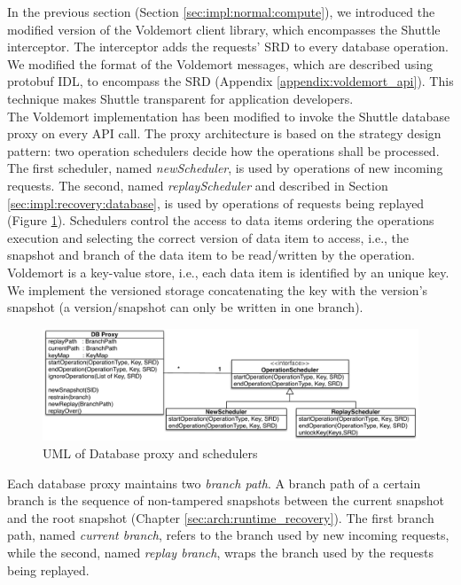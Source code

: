 In the previous section (Section \ref{sec:impl:normal:compute}), we introduced the modified version of the Voldemort client library, which encompasses the Shuttle interceptor. The interceptor adds the requests' \ac{SRD} to every database operation. We modified the format of the Voldemort messages, which are described using \acf{protobuf} \acs{IDL}, to encompass the \ac{SRD} (Appendix \ref{appendix:voldemort_api}). This technique makes Shuttle transparent for application developers.\\


The Voldemort implementation has been modified to invoke the Shuttle database proxy on every \ac{API} call. The proxy architecture is based on the strategy design pattern: two operation schedulers decide how the operations shall be processed. The first scheduler, named \emph{newScheduler}, is used by operations of new incoming requests. The second, named \emph{replayScheduler} and described in Section \ref{sec:impl:recovery:database}, is used by operations of requests being replayed (Figure \ref{fig:scheduler_uml}). Schedulers control the access to data items ordering the operations execution and selecting the correct version of data item to access, i.e., the snapshot and branch of the data item to be read/written by the operation. Voldemort is a key-value store, i.e., each data item is identified by an unique key. We implement the versioned storage concatenating the key with the version's snapshot (a version/snapshot can only be written in one branch).\\

\begin{figure}
  \centering
  \includegraphics[width=\textwidth]{arch/scheduler_uml}
  \caption{UML of Database proxy and schedulers}
  \label{fig:scheduler_uml}
\end{figure}

Each database proxy maintains two \emph{branch path}. A branch path of a certain branch is the sequence of non-tampered snapshots between the current snapshot and the root snapshot (Chapter \ref{sec:arch:runtime_recovery}). The first branch path, named \textit{current branch}, refers to the branch used by new incoming requests, while the second, named \textit{replay branch}, wraps the branch used by the requests being replayed.

